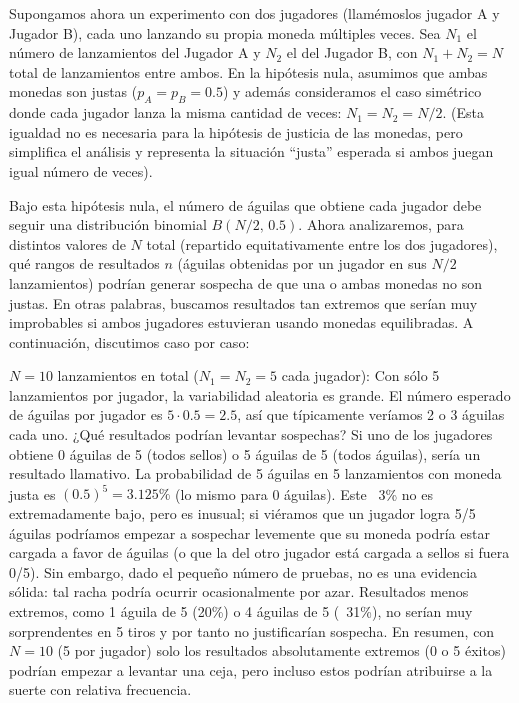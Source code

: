 \documentclass[11pt,letterpaper]{article}
\begin{document}
Supongamos ahora un experimento con dos jugadores (llamémoslos jugador A y Jugador B), cada uno lanzando su propia moneda múltiples veces. Sea $N_1$ el número de lanzamientos del Jugador A y $N_2$ el del Jugador B, con $N_1 + N_2 = N$ total de lanzamientos entre ambos. En la hipótesis nula, asumimos que ambas monedas son justas ($p_A = p_B = 0.5$) y además consideramos el caso simétrico donde cada jugador lanza la misma cantidad de veces: $N_1 = N_2 = N/2$. (Esta igualdad no es necesaria para la hipótesis de justicia de las monedas, pero simplifica el análisis y representa la situación “justa” esperada si ambos juegan igual número de veces).

Bajo esta hipótesis nula, el número de águilas que obtiene cada jugador debe seguir una distribución binomial $B(N/2,\,0.5)$. Ahora analizaremos, para distintos valores de $N$ total (repartido equitativamente entre los dos jugadores), qué rangos de resultados $n$ (águilas obtenidas por un jugador en sus $N/2$ lanzamientos) podrían generar sospecha de que una o ambas monedas no son justas. En otras palabras, buscamos resultados tan extremos que serían muy improbables si ambos jugadores estuvieran usando monedas equilibradas. A continuación, discutimos caso por caso:

$N=10$ lanzamientos en total ($N_1=N_2=5$ cada jugador): Con sólo 5 lanzamientos por jugador, la variabilidad aleatoria es grande. El número esperado de águilas por jugador es $5 \cdot 0.5 = 2.5$, así que típicamente veríamos 2 o 3 águilas cada uno. ¿Qué resultados podrían levantar sospechas? Si uno de los jugadores obtiene 0 águilas de 5 (todos sellos) o 5 águilas de 5 (todos águilas), sería un resultado llamativo. La probabilidad de 5 águilas en 5 lanzamientos con moneda justa es $(0.5)^5 = 3.125\%$ (lo mismo para 0 águilas). Este ~3\% no es extremadamente bajo, pero es inusual; si viéramos que un jugador logra 5/5 águilas podríamos empezar a sospechar levemente que su moneda podría estar cargada a favor de águilas (o que la del otro jugador está cargada a sellos si fuera 0/5). Sin embargo, dado el pequeño número de pruebas, no es una evidencia sólida: tal racha podría ocurrir ocasionalmente por azar. Resultados menos extremos, como 1 águila de 5 (20\%) o 4 águilas de 5 (~31\%), no serían muy sorprendentes en 5 tiros y por tanto no justificarían sospecha. En resumen, con $N=10$ (5 por jugador) solo los resultados absolutamente extremos (0 o 5 éxitos) podrían empezar a levantar una ceja, pero incluso estos podrían atribuirse a la suerte con relativa frecuencia.
  
\end{document}

